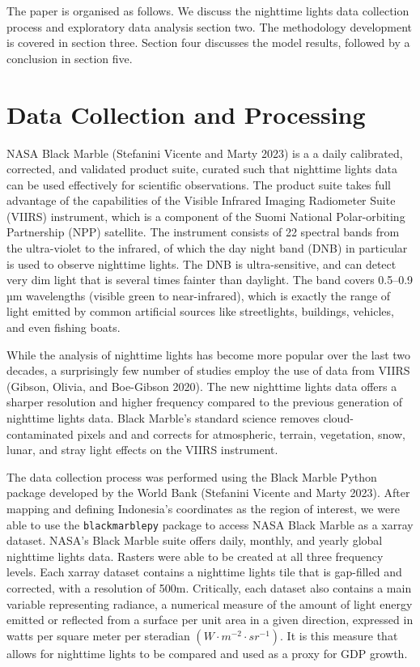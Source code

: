 \documentclass[
  manuscript=article,
  layout=publish,
  year=2026,
  volume=3,
]{den}
\begin{document}
The paper is organised as follows. We discuss the nighttime lights data
collection process and exploratory data analysis section two. The
methodology development is covered in section three. Section four
discusses the model results, followed by a conclusion in section five.

\section{Data Collection and
Processing}\label{data-collection-and-processing}

NASA Black Marble (Stefanini Vicente and Marty 2023) is a a daily
calibrated, corrected, and validated product suite, curated such that
nighttime lights data can be used effectively for scientific
observations. The product suite takes full advantage of the capabilities
of the Visible Infrared Imaging Radiometer Suite (VIIRS) instrument,
which is a component of the Suomi National Polar-orbiting Partnership
(NPP) satellite. The instrument consists of 22 spectral bands from the
ultra-violet to the infrared, of which the day night band (DNB) in
particular is used to observe nighttime lights. The DNB is
ultra-sensitive, and can detect very dim light that is several times
fainter than daylight. The band covers 0.5--0.9 µm wavelengths (visible
green to near-infrared), which is exactly the range of light emitted by
common artificial sources like streetlights, buildings, vehicles, and
even fishing boats.

While the analysis of nighttime lights has become more popular over the
last two decades, a surprisingly few number of studies employ the use of
data from VIIRS (Gibson, Olivia, and Boe-Gibson 2020). The new nighttime
lights data offers a sharper resolution and higher frequency compared to
the previous generation of nighttime lights data. Black Marble's
standard science removes cloud-contaminated pixels and and corrects for
atmospheric, terrain, vegetation, snow, lunar, and stray light effects
on the VIIRS instrument.

The data collection process was performed using the Black Marble Python
package developed by the World Bank (Stefanini Vicente and Marty 2023).
After mapping and defining Indonesia's coordinates as the region of
interest, we were able to use the \texttt{blackmarblepy} package to
access NASA Black Marble as a xarray dataset. NASA's Black Marble suite
offers daily, monthly, and yearly global nighttime lights data. Rasters
were able to be created at all three frequency levels. Each xarray
dataset contains a nighttime lights tile that is gap-filled and
corrected, with a resolution of 500m. Critically, each dataset also
contains a main variable representing radiance, a numerical measure of
the amount of light energy emitted or reflected from a surface per unit
area in a given direction, expressed in watts per square meter per
steradian \((W \cdot m^{-2} \cdot sr^{-1})\). It is this measure that
allows for nighttime lights to be compared and used as a proxy for GDP
growth.
\end{document}
